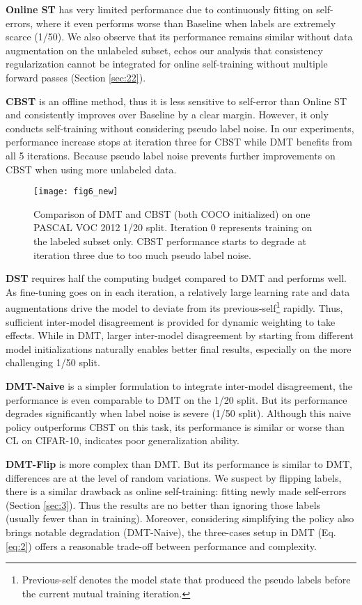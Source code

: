 \documentclass[preprint,review,10pt]{elsarticle}
\begin{document}
\textbf{Online ST} has very limited performance due to continuously fitting on self-errors, where it even performs worse than Baseline when labels are extremely scarce (1/50). We also observe that its performance remains similar without data augmentation on the unlabeled subset, echos our analysis that consistency regularization cannot be integrated for online self-training without multiple forward passes (Section \ref{sec:22}).

\textbf{CBST} is an offline method, thus it is less sensitive to self-error than Online ST and consistently improves over Baseline by a clear margin. However, it only conducts self-training without considering pseudo label noise. In our experiments, performance increase stops at iteration three for CBST while DMT benefits from all 5 iterations. Because pseudo label noise prevents further improvements on CBST when using more unlabeled data.

\begin{figure}[t]
\centering
\texttt{[image: fig6\_new]}
\caption{Comparison of DMT and CBST (both COCO initialized) on one PASCAL VOC 2012 1/20 split. Iteration 0 represents training on the labeled subset only. CBST performance starts to degrade at iteration three due to too much pseudo label noise. }
\label{fig6}
\end{figure}



\textbf{DST} requires half the computing budget compared to DMT and performs well. As fine-tuning goes on in each iteration, a relatively large learning rate and data augmentations drive the model to deviate from its previous-self\footnote{Previous-self denotes the model state that produced the pseudo labels before the current mutual training iteration.} rapidly. Thus, sufficient inter-model disagreement is provided for dynamic weighting to take effects. While in DMT, larger inter-model disagreement by starting from different model initializations naturally enables better final results, especially on the more challenging 1/50 split.

\textbf{DMT-Naive} is a simpler formulation to integrate inter-model disagreement, the performance is even comparable to DMT on the 1/20 split. But its performance degrades significantly when label noise is severe (1/50 split). Although this naive policy outperforms CBST on this task, its performance is similar or worse than CL on CIFAR-10, indicates poor generalization ability.

\textbf{DMT-Flip} is more complex than DMT. But its performance is similar to DMT, differences are at the level of random variations. We suspect by flipping labels, there is a similar drawback as online self-training: fitting newly made self-errors (Section \ref{sec:3}). Thus the results are no better than ignoring those labels (usually fewer than  in training). Moreover, considering simplifying the policy also brings notable degradation (DMT-Naive), the three-cases setup in DMT (Eq. \ref{eq:2}) offers a reasonable trade-off between performance and complexity.
\end{document}
